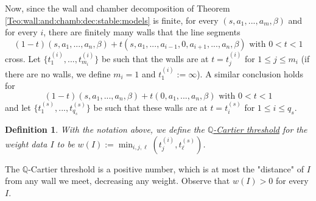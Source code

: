 \documentclass[11pt]{amsart}
\newtheorem{Def}[theorem]{Definition}
\theoremstyle{definition}
\begin{document}
 Now, since the wall and chamber decomposition of Theorem \ref{Teo:wall:and:chamb:dec:stable:models} is finite,
 for every $(s,a_1,...,a_m,\beta)$ and for every $i$, there are finitely many walls
 that the line segments $$(1-t)(s,a_1,...,a_n,\beta)+t(s,a_1,...,a_{i-1},0,a_{i+1},...,a_n,\beta) \text{ with }0< t < 1$$ cross. Let $\{t_1^{(i)},...,t_{m_i}^{(i)}\}$ be such that the walls are at $t=t_j^{(i)}$ for $1 \le j \le m_i$ (if there are no walls, we define $m_i=1$ and $t^{(i)}_1:=\infty$).
 A similar conclusion holds
 for $$(1-t)(s,a_1,...,a_n,\beta)+t(0,a_1,...,a_n,\beta) \text{ with }0< t < 1$$
 and let $\{t_{1}^{(s)},...,t_{q_s}^{(s)}\}$ be such that these walls are at $t=t_i^{(s)}$ for $1 \le i \le q_s$.
\begin{Def}
 With the notation above, we
 define the \underline{$\mathbb{Q}$-Cartier threshold} for the weight data $I$ to be $w(I):=\operatorname{min}_{i,j,\ell}(t_j^{(i)},t_\ell^{(s)})$.\end{Def}
 The $\mathbb{Q}$-Cartier threshold is a positive number, which is at most the "distance" of $I$ from any wall we meet, decreasing any weight.
 Observe that
 $w(I)>0$ for every $I$.
\end{document}
